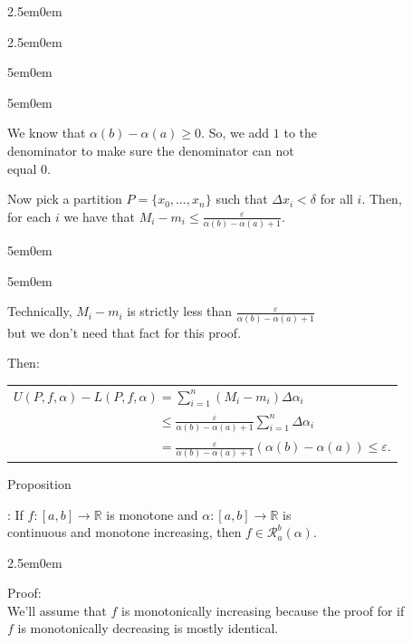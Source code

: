 \documentclass{book}
\newcommand{\hThree}{%
   \color{PineGreen!85!Orange}
   \fontsize{13}{15}\selectfont%
}
\newcommand{\teachComment}{
   \color{Orange}%
   \fontsize{12}{14}\selectfont%
}
\newenvironment{myIndent}{%
   \begin{adjustwidth}{2.5em}{0em}%
}{%
   \end{adjustwidth}%
}
\newenvironment{myDindent}{%
   \begin{adjustwidth}{5em}{0em}%
}{%
   \end{adjustwidth}%
}
\newcounter{PropNumber}
\newcommand{\propCount}[1][1]{%
   \addtocounter{PropNumber}{#1}%
   \thePropNumber%
}
\newcommand{\retTwo}{\hfill\bigbreak}
\begin{document}
{\begin{myIndent}
{\begin{myIndent}
      {\begin{myDindent}\begin{myDindent}\teachComment
         We know that $\alpha(b) - \alpha(a) \geq 0$. So, we add $1$ to the\\ denominator to make sure the denominator can not\\ equal $0$.\retTwo
      \end{myDindent}\end{myDindent}}

      Now pick a partition $P = \{x_0, \ldots, x_n\}$ such that $\Delta x_i < \delta$ for all $i$. Then,\\ for each $i$ we have that $M_i - m_i \leq \frac{\varepsilon}{\alpha(b) - \alpha(a) + 1}$.\\ [-8pt]
      
      {\begin{myDindent}\begin{myDindent}\teachComment
         Technically, $M_i - m_i$ is strictly less than $\frac{\varepsilon}{\alpha(b) - \alpha(a) + 1}$\\ but we don't need that fact for this proof.\retTwo
      \end{myDindent}\end{myDindent}}

      Then:\\
      \begin{tabular}{l}
         $U(P, f, \alpha) - L(P, f, \alpha) = \sum\limits_{i=1}^n(M_i - m_i)\Delta \alpha_i$\\ [2pt]
         $\phantom{U(P, f, \alpha) - L(P, f, \alpha)} \leq \frac{\varepsilon}{\alpha(b) - \alpha(a) + 1}\sum\limits_{i=1}^n\Delta \alpha_i$\\ [2pt]
         $\phantom{U(P, f, \alpha) - L(P, f, \alpha)} =  \frac{\varepsilon}{\alpha(b) - \alpha(a) + 1}(\alpha(b) - \alpha(a)) \leq \varepsilon$.\retTwo\retTwo
      \end{tabular}
   \end{myIndent}}

   Proposition \propCount: If $f: [a, b] \longrightarrow \mathbb{R}$ is monotone and $\alpha: [a, b] \longrightarrow \mathbb{R}$ is\\ continuous and monotone increasing, then $f \in \mathscr{R}_a^b(\alpha)$.
   
   {\begin{myIndent}\hThree
      Proof:\\
      We'll assume that $f$ is monotonically increasing because the proof for if\\ $f$ is monotonically decreasing is mostly identical.\retTwo


\end{myIndent}}
\end{myIndent}}
\end{document}
